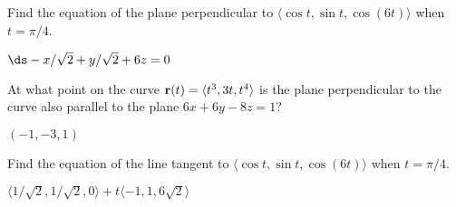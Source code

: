 \begin{enumialphparenastyle}
\begin{ex}
Find the equation of the plane perpendicular to 
$\langle \cos t, \sin t, \cos(6t)\rangle$ when $t=\pi/4$.
\begin{sol} $\ds -x/\sqrt2+y/\sqrt2+6z=0$
\end{sol}
\end{ex}

\begin{ex}
At what point on the curve 
${\bf r}(t) = \langle t^3,3t,t^4\rangle$ is the
plane perpendicular to the curve also parallel to the plane $6x+6y-8z=1$?
\begin{sol} $(-1,-3,1)$
\end{sol}
\end{ex}

\begin{ex}
Find the equation of the line tangent to 
$\langle \cos t, \sin t, \cos(6t)\rangle$ when $t=\pi/4$.
\begin{sol} $\langle 1/\sqrt2,1/\sqrt2,0\rangle+t\langle -1,1,6\sqrt2\rangle$
\end{sol}
\end{ex}

\end{enumialphparenastyle}